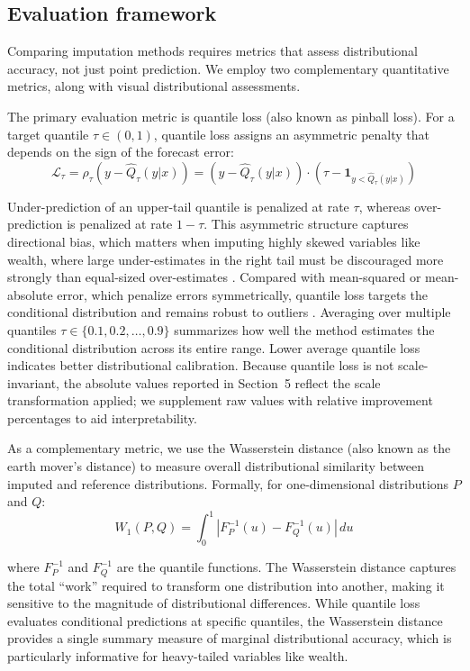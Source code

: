 \subsection{Evaluation framework}

Comparing imputation methods requires metrics that assess distributional accuracy, not just point prediction. We employ two complementary quantitative metrics, along with visual distributional assessments.

The primary evaluation metric is quantile loss (also known as pinball loss). For a target quantile $\tau \in (0,1)$, quantile loss assigns an asymmetric penalty that depends on the sign of the forecast error:
\begin{equation}
    \mathcal{L}_\tau = \rho_\tau(y - \hat{Q}_\tau(y|x)) = (y - \hat{Q}_\tau(y|x)) \cdot (\tau - \mathbf{1}_{y < \hat{Q}_\tau(y|x)})
\end{equation}

Under-prediction of an upper-tail quantile is penalized at rate $\tau$, whereas over-prediction is penalized at rate $1 - \tau$. This asymmetric structure captures directional bias, which matters when imputing highly skewed variables like wealth, where large under-estimates in the right tail must be discouraged more strongly than equal-sized over-estimates \citep{koenker1978regression}. Compared with mean-squared or mean-absolute error, which penalize errors symmetrically, quantile loss targets the conditional distribution and remains robust to outliers \citep{ghenis2018quantile}. Averaging over multiple quantiles $\tau \in \{0.1, 0.2, \ldots, 0.9\}$ summarizes how well the method estimates the conditional distribution across its entire range. Lower average quantile loss indicates better distributional calibration. Because quantile loss is not scale-invariant, the absolute values reported in Section~5 reflect the scale transformation applied; we supplement raw values with relative improvement percentages to aid interpretability.

As a complementary metric, we use the Wasserstein distance (also known as the earth mover's distance) to measure overall distributional similarity between imputed and reference distributions. Formally, for one-dimensional distributions $P$ and $Q$:
\begin{equation}
    W_1(P, Q) = \int_0^1 |F_P^{-1}(u) - F_Q^{-1}(u)|\, du
\end{equation}

where $F_P^{-1}$ and $F_Q^{-1}$ are the quantile functions. The Wasserstein distance captures the total ``work'' required to transform one distribution into another, making it sensitive to the magnitude of distributional differences. While quantile loss evaluates conditional predictions at specific quantiles, the Wasserstein distance provides a single summary measure of marginal distributional accuracy, which is particularly informative for heavy-tailed variables like wealth.

